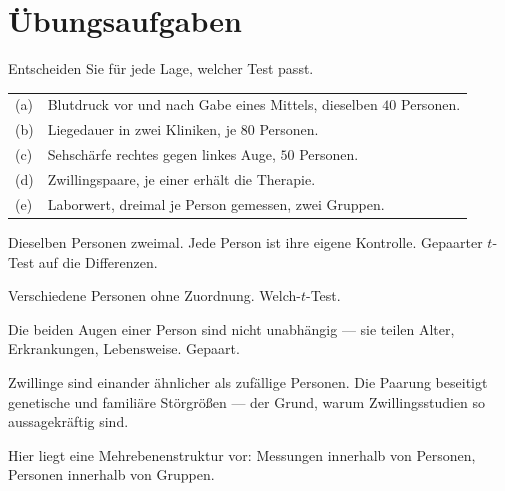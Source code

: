 \section{Übungsaufgaben}

\begin{aufgabe}
Entscheiden Sie für jede Lage, welcher Test passt.
\begin{center}
{\small
\renewcommand{\arraystretch}{1.4}
\begin{tabular}{@{}P{0.8cm}P{7.6cm}@{}}
\toprule
(a) & Blutdruck vor und nach Gabe eines Mittels, dieselben $40$ Personen.\\
(b) & Liegedauer in zwei Kliniken, je $80$ Personen.\\
(c) & Sehschärfe rechtes gegen linkes Auge, $50$ Personen.\\
(d) & Zwillingspaare, je einer erhält die Therapie.\\
(e) & Laborwert, dreimal je Person gemessen, zwei Gruppen.\\
\bottomrule
\end{tabular}}
\end{center}

\loesung
{}
Dieselben Personen zweimal. Jede Person ist ihre eigene Kontrolle. Gepaarter $t$-Test auf die Differenzen.

Verschiedene Personen ohne Zuordnung. Welch-$t$-Test.

Die beiden Augen einer Person sind nicht unabhängig --- sie teilen Alter, Erkrankungen, Lebensweise. Gepaart.

\begin{center}
\begin{minipage}{0.86\textwidth}
\end{minipage}
\end{center}

Zwillinge sind einander ähnlicher als zufällige Personen. Die Paarung beseitigt genetische und familiäre Störgrößen --- der Grund, warum Zwillingsstudien so aussagekräftig sind.

Hier liegt eine Mehrebenenstruktur vor: Messungen innerhalb von Personen, Personen innerhalb von Gruppen.


\end{aufgabe}

